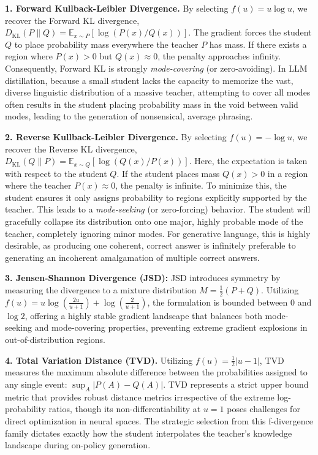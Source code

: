 \documentclass{article} %
\begin{document}
\textbf{1. Forward Kullback-Leibler Divergence.} By selecting $f(u) = u \log u$, we recover the Forward KL divergence, $D_{\mathrm{KL}}(P \parallel Q) = \mathbb{E}_{x \sim P} [ \log(P(x)/Q(x)) ]$. The gradient forces the student $Q$ to place probability mass everywhere the teacher $P$ has mass. If there exists a region where $P(x) > 0$ but $Q(x) \approx 0$, the penalty approaches infinity. Consequently, Forward KL is strongly \textit{mode-covering} (or zero-avoiding). In LLM distillation, because a small student lacks the capacity to memorize the vast, diverse linguistic distribution of a massive teacher, attempting to cover all modes often results in the student placing probability mass in the void between valid modes, leading to the generation of nonsensical, average phrasing.

\textbf{2. Reverse Kullback-Leibler Divergence.} By selecting $f(u) = -\log u$, we recover the Reverse KL divergence, $D_{\mathrm{KL}}(Q \parallel P) = \mathbb{E}_{x \sim Q} [ \log(Q(x)/P(x)) ]$. Here, the expectation is taken with respect to the student $Q$. If the student places mass $Q(x) > 0$ in a region where the teacher $P(x) \approx 0$, the penalty is infinite. To minimize this, the student ensures it only assigns probability to regions explicitly supported by the teacher. This leads to a \textit{mode-seeking} (or zero-forcing) behavior. The student will gracefully collapse its distribution onto one major, highly probable mode of the teacher, completely ignoring minor modes. For generative language, this is highly desirable, as producing one coherent, correct answer is infinitely preferable to generating an incoherent amalgamation of multiple correct answers.

\textbf{3. Jensen-Shannon Divergence (JSD):} JSD introduces symmetry by measuring the divergence to a mixture distribution $M = \frac{1}{2}(P + Q)$. Utilizing $f(u) = u \log\left(\frac{2u}{u+1}\right) + \log\left(\frac{2}{u+1}\right)$, the formulation is bounded between 0 and $\log 2$, offering a highly stable gradient landscape that balances both mode-seeking and mode-covering properties, preventing extreme gradient explosions in out-of-distribution regions.

\textbf{4. Total Variation Distance (TVD).} Utilizing $f(u) = \frac{1}{2}|u-1|$, TVD measures the maximum absolute difference between the probabilities assigned to any single event: $\sup_{A} |P(A) - Q(A)|$. TVD represents a strict upper bound metric that provides robust distance metrics irrespective of the extreme log-probability ratios, though its non-differentiability at $u=1$ poses challenges for direct optimization in neural spaces. The strategic selection from this f-divergence family dictates exactly how the student interpolates the teacher's knowledge landscape during on-policy generation.
\end{document}
